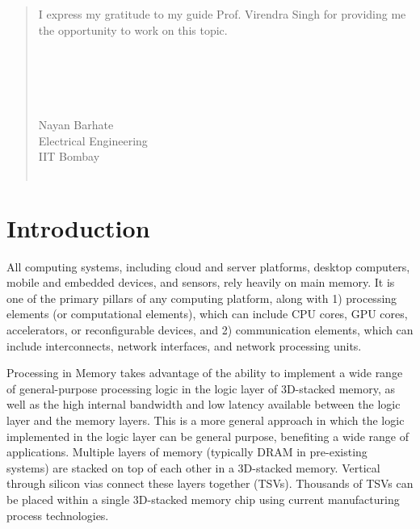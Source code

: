 \documentclass[a4paper,12pt, final]{report}
\begin{document}
\renewcommand{\abstractname}{Acknowledgement}
\begin{abstract}
I express my gratitude to my guide Prof. Virendra Singh for providing me the opportunity to work on this topic. 
\\\\
\\\\
\\\\
Nayan Barhate\\
Electrical Engineering\\
IIT Bombay\\\

\end{abstract}


\clearpage 
\renewcommand{\abstractname}{Abstract} 

\tableofcontents
  \listoffigures

\chapter{Introduction}
All computing systems, including cloud and server platforms, desktop computers, mobile and embedded devices, and sensors, rely heavily on main memory. It is one of the primary pillars of any computing platform, along with 1) processing elements (or computational elements), which can include CPU cores, GPU cores, accelerators, or reconfigurable devices, and 2) communication elements, which can include interconnects, network interfaces, and network processing units.

Processing in Memory takes advantage of the ability to implement a wide range of 
general-purpose processing logic in the logic layer of 3D-stacked memory, as well as the 
high internal bandwidth and low latency available between the logic layer and the memory 
layers. This is a more general approach in which the logic implemented in the logic layer 
can be general purpose, benefiting a wide range of applications. Multiple layers of memory
(typically DRAM in pre-existing systems) are stacked on top of each other in a 3D-stacked
memory. Vertical through silicon vias connect these layers together (TSVs). Thousands of 
TSVs can be placed within a single 3D-stacked memory chip using current manufacturing process technologies.
\end{document}
